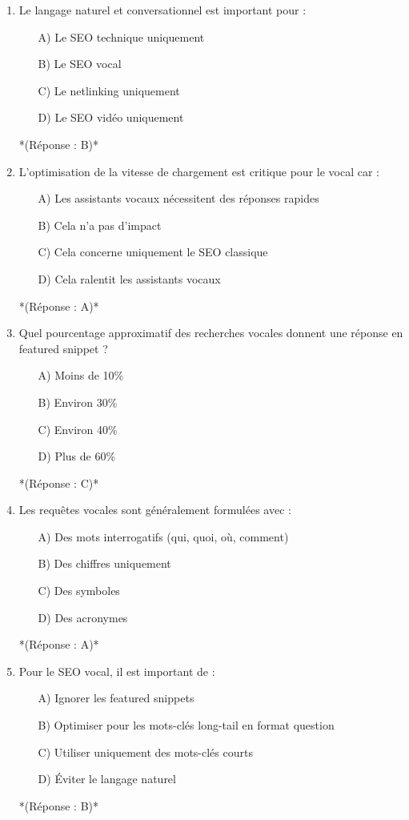\documentclass[12pt,a4paper,twoside]{report}
\begin{document}
\begin{enumerate}
    \item Le langage naturel et conversationnel est important pour :
    \begin{itemize}
        \item[A)] Le SEO technique uniquement
        \item[B)] Le SEO vocal
        \item[C)] Le netlinking uniquement
        \item[D)] Le SEO vidéo uniquement
    \end{itemize}
    *(Réponse : B)*

    \item L'optimisation de la vitesse de chargement est critique pour le vocal car :
    \begin{itemize}
        \item[A)] Les assistants vocaux nécessitent des réponses rapides
        \item[B)] Cela n'a pas d'impact
        \item[C)] Cela concerne uniquement le SEO classique
        \item[D)] Cela ralentit les assistants vocaux
    \end{itemize}
    *(Réponse : A)*

    \item Quel pourcentage approximatif des recherches vocales donnent une réponse en featured snippet ?
    \begin{itemize}
        \item[A)] Moins de 10\%
        \item[B)] Environ 30\%
        \item[C)] Environ 40\%
        \item[D)] Plus de 60\%
    \end{itemize}
    *(Réponse : C)*

    \item Les requêtes vocales sont généralement formulées avec :
    \begin{itemize}
        \item[A)] Des mots interrogatifs (qui, quoi, où, comment)
        \item[B)] Des chiffres uniquement
        \item[C)] Des symboles
        \item[D)] Des acronymes
    \end{itemize}
    *(Réponse : A)*

    \item Pour le SEO vocal, il est important de :
    \begin{itemize}
        \item[A)] Ignorer les featured snippets
        \item[B)] Optimiser pour les mots-clés long-tail en format question
        \item[C)] Utiliser uniquement des mots-clés courts
        \item[D)] Éviter le langage naturel
    \end{itemize}
    *(Réponse : B)*


\end{enumerate}
\end{document}
